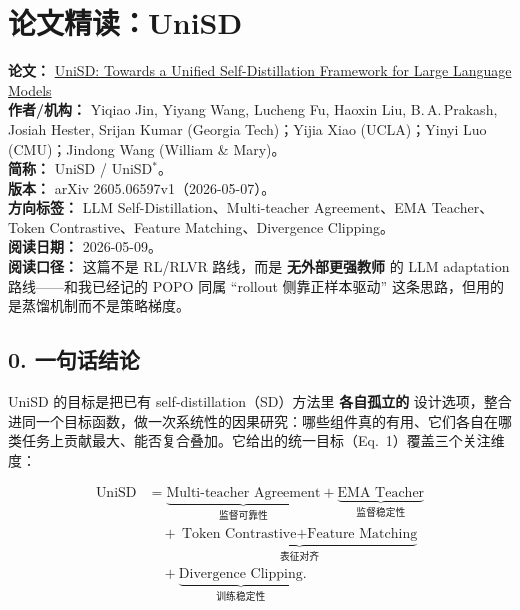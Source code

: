 
\section{论文精读：UniSD}

\begin{conceptbox}
\textbf{论文：} \href{https://arxiv.org/abs/2605.06597}{UniSD: Towards a Unified Self-Distillation Framework for Large Language Models}\\
\textbf{作者/机构：} Yiqiao Jin, Yiyang Wang, Lucheng Fu, Haoxin Liu, B.\,A.\,Prakash, Josiah Hester, Srijan Kumar (Georgia Tech)；Yijia Xiao (UCLA)；Yinyi Luo (CMU)；Jindong Wang (William \& Mary)。\\
\textbf{简称：} UniSD / UniSD$^{*}$。\\
\textbf{版本：} arXiv 2605.06597v1（2026-05-07）。\\
\textbf{方向标签：} LLM Self-Distillation、Multi-teacher Agreement、EMA Teacher、Token Contrastive、Feature Matching、Divergence Clipping。\\
\textbf{阅读日期：} 2026-05-09。\\
\textbf{阅读口径：} 这篇不是 RL/RLVR 路线，而是 \textbf{无外部更强教师} 的 LLM adaptation 路线——和我已经记的 POPO 同属 ``rollout 侧靠正样本驱动'' 这条思路，但用的是蒸馏机制而不是策略梯度。
\end{conceptbox}

\subsection{0. 一句话结论}

UniSD 的目标是把已有 self-distillation（SD）方法里 \textbf{各自孤立的} 设计选项，整合进同一个目标函数，做一次系统性的因果研究：哪些组件真的有用、它们各自在哪类任务上贡献最大、能否复合叠加。它给出的统一目标（Eq.~1）覆盖三个关注维度：

\[
\begin{aligned}
\text{UniSD} &= \underbrace{\text{Multi-teacher Agreement}}_{\text{监督可靠性}}
              + \underbrace{\text{EMA Teacher}}_{\text{监督稳定性}}\\
&\quad + \underbrace{\text{Token Contrastive} + \text{Feature Matching}}_{\text{表征对齐}}\\
&\quad + \underbrace{\text{Divergence Clipping}}_{\text{训练稳定性}}.
\end{aligned}
\]

